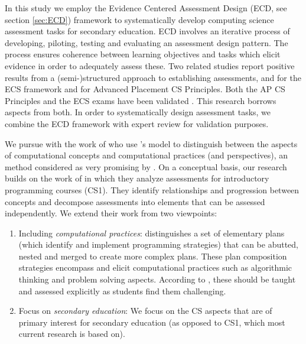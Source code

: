 In this study we employ the Evidence Centered Assessment Design (ECD, see section \ref{sec:ECD}) framework to systematically develop computing science assessment tasks for secondary education. ECD involves an iterative process of developing, piloting, testing and evaluating an assessment design pattern. The process ensures coherence between learning objectives and tasks which elicit evidence in order to adequately assess these. Two related studies report positive results from a (semi-)structured approach to establishing assessments,  and  for the ECS framework and  for Advanced Placement CS Principles. Both the AP CS Principles and the ECS exams have been validated \cite{2010TewGuzdial}. This research borrows aspects from both. In order to systematically design assessment tasks, we combine the ECD framework with expert review for validation purposes.




We pursue with the work of \cite{LyeKoh2014} who use \citeauthor{BrennanResnick2012}'s model to distinguish between the aspects of computational concepts and computational practices (and perspectives), an method considered as very promising by \cite{voogt2017effecten}. On a conceptual basis, our research builds on the work of  in which they analyze assessments for introductory programming courses (CS1). They identify relationships and progression between concepts and decompose assessments into elements that can be assessed independently. We extend their work from two viewpoints:
\begin{enumerate}
\item Including \emph{computational practices}:  distinguishes a set of elementary plans (which identify and implement programming strategies) that can be abutted, nested and merged to create more complex plans. These plan composition strategies encompass and elicit computational practices such as algorithmic thinking and problem solving aspects. According to \citeauthor{deRaadt2009teachingPlans}, these should be taught and assessed explicitly as students find them challenging.


\item Focus on \emph{secondary education}: We focus on the CS aspects that are of primary interest for secondary education (as opposed to CS1, which most current research is based on).

\end{enumerate}


